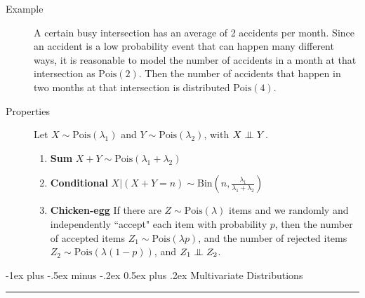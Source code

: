 \documentclass[10pt,landscape]{article}
\makeatletter
\newcommand\independent{\protect\mathpalette{\protect\independenT}{\perp}}
\def\independenT#1#2{\mathrel{\setbox0\hbox{$#1#2$}%
    \copy0\kern-\wd0\mkern4mu\box0}}
\newcommand{\Bin}{\textrm{Bin}}
\newcommand{\Pois}{\textrm{Pois}}
\renewcommand{\section}{\@startsection{section}{1}{0mm}%
                                {-1ex plus -.5ex minus -.2ex}%
                                {0.5ex plus .2ex}%
                                {\normalfont\large\bfseries}}
\makeatother
\begin{document}
\begin{multicols*}{3}
\begin{description}
    \item[Example] A certain busy intersection has an average of 2 accidents per month. Since an accident is a low probability event that can happen many different ways, it is reasonable to model the number of accidents in a month at that intersection as $\Pois(2)$. Then the number of accidents that happen in two months at that intersection is distributed $\Pois(4)$.
    
    \item[Properties]
Let $X \sim \Pois(\lambda_1)$ and $Y \sim \Pois(\lambda_2)$, with $X \independent Y$.

\begin{enumerate}
    \item \textbf{Sum} $X + Y \sim \Pois(\lambda_1 + \lambda_2)$
    \item \textbf{Conditional} $X | (X + Y = n) \sim \Bin\left(n, \frac{\lambda_1}{\lambda_1 + \lambda_2}\right)$
    \item \textbf{Chicken-egg} If there are $Z \sim \Pois(\lambda)$ items and we randomly and independently ``accept" each item with probability $p$, then the number of accepted items $Z_1 \sim \Pois(\lambda p)$, and the number of rejected items $Z_2 \sim \Pois(\lambda (1-p))$, and $Z_1 \independent Z_2$.
\end{enumerate}
    
\end{description}


\section{Multivariate Distributions} \smallskip \hrule height 2pt \smallskip



\end{multicols*}
\end{document}
